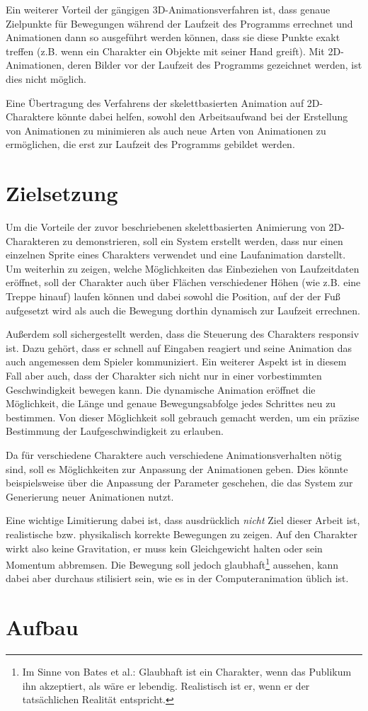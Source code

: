 Ein weiterer Vorteil der gängigen 3D-Animationsverfahren ist, dass genaue Zielpunkte für Bewegungen während der Laufzeit des Programms errechnet und Animationen dann so ausgeführt werden können, dass sie diese Punkte exakt treffen (z.B. wenn ein Charakter ein Objekte mit seiner Hand greift). Mit 2D-Animationen, deren Bilder vor der Laufzeit des Programms gezeichnet werden, ist dies nicht möglich.

Eine Übertragung des Verfahrens der skelettbasierten Animation auf 2D-Charaktere könnte dabei helfen, sowohl den Arbeitsaufwand bei der Erstellung von Animationen zu minimieren als auch neue Arten von Animationen zu ermöglichen, die erst zur Laufzeit des Programms gebildet werden.

\section{Zielsetzung}
Um die Vorteile der zuvor beschriebenen skelettbasierten Animierung von 2D-Charakteren zu demonstrieren, soll ein System erstellt werden, dass nur einen einzelnen Sprite eines Charakters verwendet und eine Laufanimation darstellt. Um weiterhin zu zeigen, welche Möglichkeiten das Einbeziehen von Laufzeitdaten eröffnet, soll der Charakter auch über Flächen verschiedener Höhen (wie z.B. eine Treppe hinauf) laufen können und dabei sowohl die Position, auf der der Fuß aufgesetzt wird als auch die Bewegung dorthin dynamisch zur Laufzeit errechnen.

Außerdem soll sichergestellt werden, dass die Steuerung des Charakters responsiv ist. Dazu gehört, dass er schnell auf Eingaben reagiert und seine Animation das auch angemessen dem Spieler kommuniziert. Ein weiterer Aspekt ist in diesem Fall aber auch, dass der Charakter sich nicht nur in einer vorbestimmten Geschwindigkeit bewegen kann. Die dynamische Animation eröffnet die Möglichkeit, die Länge und genaue Bewegungsabfolge jedes Schrittes neu zu bestimmen. Von dieser Möglichkeit soll gebrauch gemacht werden, um ein präzise Bestimmung der Laufgeschwindigkeit zu erlauben.

Da für verschiedene Charaktere auch verschiedene Animationsverhalten nötig sind, soll es Möglichkeiten zur Anpassung der Animationen geben. Dies könnte beispielsweise über die Anpassung der Parameter geschehen, die das System zur Generierung neuer Animationen nutzt.

Eine wichtige Limitierung dabei ist, dass ausdrücklich \textit{nicht} Ziel dieser Arbeit ist, realistische bzw. physikalisch korrekte Bewegungen zu zeigen. Auf den Charakter wirkt also keine Gravitation, er muss kein Gleichgewicht halten oder sein Momentum abbremsen. Die Bewegung soll jedoch glaubhaft\footnote{Im Sinne von Bates et al.\cite{bates1994role}: Glaubhaft ist ein Charakter, wenn das Publikum ihn akzeptiert, als wäre er lebendig. Realistisch ist er, wenn er der tatsächlichen Realität entspricht.} aussehen, kann dabei aber durchaus stilisiert sein, wie es in der Computeranimation üblich ist.

\section{Aufbau}